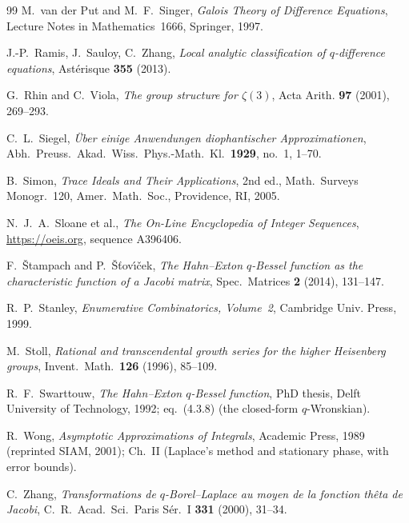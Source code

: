 \documentclass[11pt]{article}
\theoremstyle{plain}
\theoremstyle{definition}
\theoremstyle{remark}
\begin{document}
\begin{thebibliography}{99}
 M.~van der Put and M.~F.~Singer, \emph{Galois Theory of Difference
Equations}, Lecture Notes in Mathematics~1666, Springer, 1997.

 J.-P.~Ramis, J.~Sauloy, C.~Zhang, \emph{Local analytic classification of
$q$-difference equations}, Ast\'erisque \textbf{355} (2013).

 G.~Rhin and C.~Viola, \emph{The group structure for $\zeta(3)$}, Acta Arith.
\textbf{97} (2001), 269--293.

 C.~L.~Siegel, \emph{\"Uber einige Anwendungen diophantischer Approximationen},
Abh.\ Preuss.\ Akad.\ Wiss.\ Phys.-Math.\ Kl.\ \textbf{1929}, no.~1, 1--70.

 B.~Simon, \emph{Trace Ideals and Their Applications}, 2nd ed., Math.\ Surveys
Monogr.~120, Amer.\ Math.\ Soc., Providence, RI, 2005.

 N.~J.~A.~Sloane et al., \emph{The On-Line Encyclopedia of Integer Sequences},
\url{https://oeis.org}, sequence A396406.

 F.~\v{S}tampach and P.~\v{S}\v{t}ov\'{\i}\v{c}ek, \emph{The
Hahn--Exton $q$-Bessel function as the characteristic function of a Jacobi matrix}, Spec.\
Matrices \textbf{2} (2014), 131--147.

 R.~P.~Stanley, \emph{Enumerative Combinatorics, Volume~2}, Cambridge Univ.
Press, 1999.

 M.~Stoll, \emph{Rational and transcendental growth series for the higher
Heisenberg groups}, Invent.\ Math.\ \textbf{126} (1996), 85--109.

 R.~F.~Swarttouw, \emph{The Hahn--Exton $q$-Bessel function}, PhD thesis,
Delft University of Technology, 1992; eq.~(4.3.8) (the closed-form $q$-Wronskian).

 R.~Wong, \emph{Asymptotic Approximations of Integrals}, Academic Press, 1989
(reprinted SIAM, 2001); Ch.~II (Laplace's method and stationary phase, with error bounds).

 C.~Zhang, \emph{Transformations de $q$-Borel--Laplace au moyen de la fonction
th\^eta de Jacobi}, C.\ R.\ Acad.\ Sci.\ Paris S\'er.\ I \textbf{331} (2000), 31--34.
\end{thebibliography}
\end{document}
